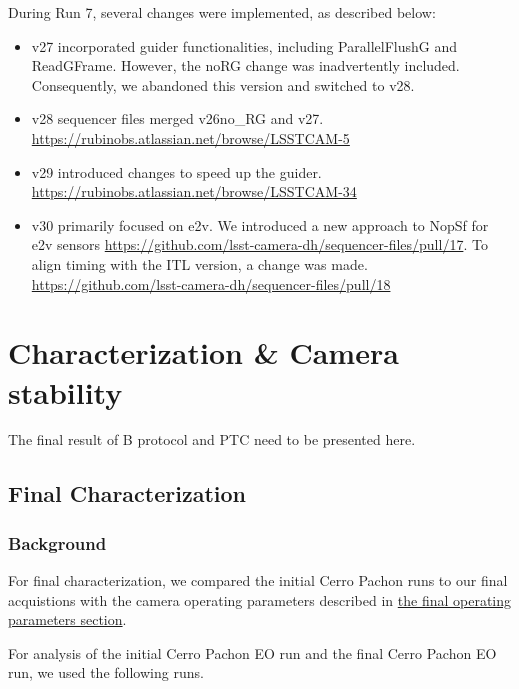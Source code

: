 During Run 7, several changes were implemented, as described below:

\begin{itemize}
\tightlist
\item
  v27 incorporated guider functionalities, including ParallelFlushG and
  ReadGFrame. However, the noRG change was inadvertently included.
  Consequently, we abandoned this version and switched to v28.
\item
  v28 sequencer files merged v26\label{no_rg}{no\_RG} and
  v27. \url{https://rubinobs.atlassian.net/browse/LSSTCAM-5}
\item
  v29 introduced changes to speed up the guider.
  \url{https://rubinobs.atlassian.net/browse/LSSTCAM-34}
\item
  v30 primarily focused on e2v. We introduced a new approach to NopSf
  for e2v sensors
  \url{https://github.com/lsst-camera-dh/sequencer-files/pull/17}. To
  align timing with the ITL version, a change was made.
  \url{https://github.com/lsst-camera-dh/sequencer-files/pull/18}
\end{itemize}


\section{Characterization \& Camera
stability}\label{characterization-camera-stability}

The final result of B protocol and PTC need to be presented here.

\subsection{Final Characterization}\label{final-characterization-1}

\subsubsection{Background}\label{background-2}

For final characterization, we compared the initial Cerro Pachon runs to
our final acquistions with the camera operating parameters described in
\href{https://sitcomtn-148.lsst.io/v/main/index.html\#run-7-final-operating-parameters}{the
final operating parameters section}.

For analysis of the initial Cerro Pachon EO run and the final Cerro
Pachon EO run, we used the following runs.

